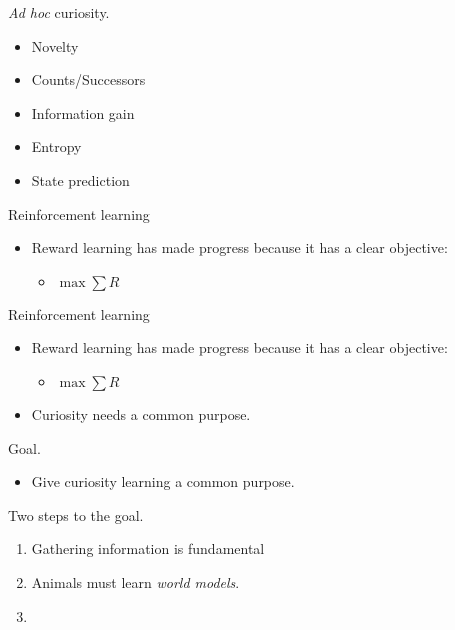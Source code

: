 \documentclass[10pt]{beamer}
\begin{document}
\begin{frame}[fragile]{\textit{Ad hoc} curiosity.}
\begin{itemize}
    \item Novelty
    \item Counts/Successors
    \item Information gain
    \item Entropy
    \item State prediction
\end{itemize}
\end{frame}

\begin{frame}[fragile]{Reinforcement learning}
\begin{itemize}
    \item Reward learning has made progress because it has a clear objective:
    \begin{itemize}
        \item $ \max \sum R$
    \end{itemize}
\end{itemize}
\end{frame}

\begin{frame}[fragile]{Reinforcement learning}
\begin{itemize}
    \item Reward learning has made progress because it has a clear objective:
    \begin{itemize}
        \item $ \max \sum R$
    \end{itemize}
    \item Curiosity needs a common purpose.
\end{itemize}
\end{frame}

\begin{frame}[fragile]{Goal.}
\begin{itemize}
\item Give curiosity learning a common purpose.
\end{itemize}
\end{frame}

\begin{frame}[fragile]{Two steps to the goal.}
\begin{enumerate}
    \item Gathering information is fundamental
    \item Animals must learn \textit{world models}.
    \item %
\end{enumerate}
\end{frame}
\end{document}
